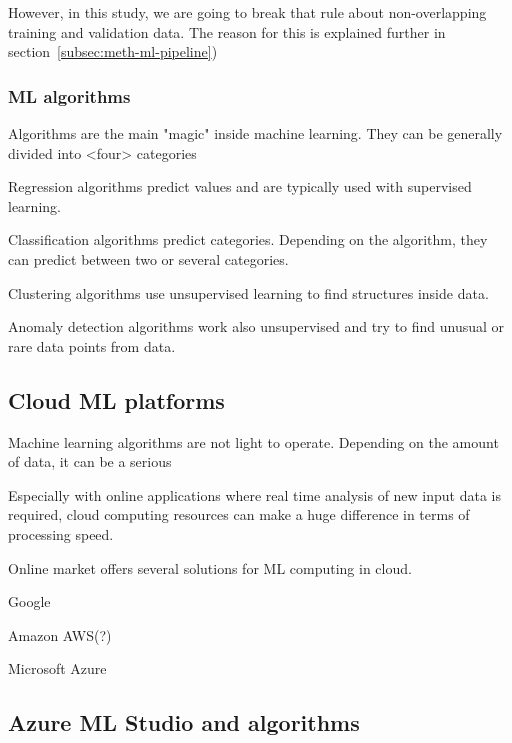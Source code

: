 However, in this study,
we are going to break that rule
about non-overlapping training and validation data.
The reason for this is explained further in section~\ref{subsec:meth-ml-pipeline})

\subsubsection*{ML algorithms}
Algorithms are the main "magic" inside machine learning. %
They can be generally divided into <four> categories %

Regression algorithms predict values
and are typically used with supervised learning.

Classification algorithms predict categories.
Depending on the algorithm,
they can predict between two or several categories.

Clustering algorithms use unsupervised learning
to find structures inside data.

Anomaly detection algorithms work also unsupervised
and try to find unusual or rare data points from data.


\subsection{Cloud ML platforms}\label{subsec:bg-cloud-ml-platforms}

Machine learning algorithms are not light to operate.
Depending on the amount of data,
it can be a serious %

Especially with online applications
where real time analysis of new input data is required,
cloud computing resources can make a huge difference
in terms of processing speed. %

Online market offers several solutions for ML computing in cloud.

Google

Amazon AWS(?)

Microsoft Azure\cite{altexsoft}




\subsection{Azure ML Studio and algorithms}\label{subsec:bg-azure-ml-studio-algorithms}


